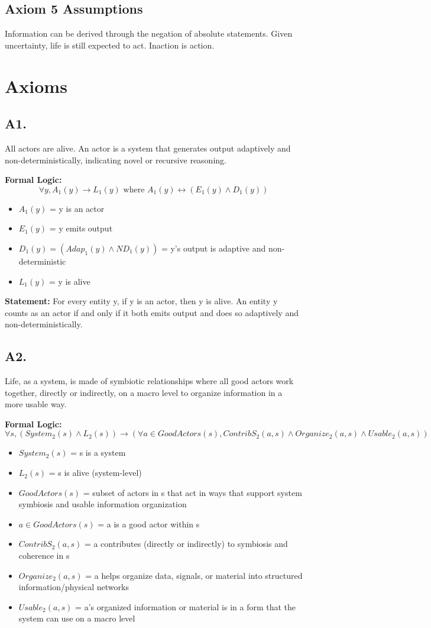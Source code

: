 \documentclass[11pt]{article}
\begin{document}
\subsection*{Axiom 5 Assumptions}
Information can be derived through the negation of absolute statements. 
Given uncertainty, life is still expected to act.
Inaction is action.

\section*{Axioms}

\subsection*{A1.}
All actors are alive. An actor is a system that generates output adaptively and non-deterministically, indicating novel or recursive reasoning. 

\textbf{Formal Logic:}
\[
\forall y, A_1(y) \rightarrow L_1(y) \text{ where } A_1(y) \leftrightarrow (E_1(y) \land D_1(y))
\]
\begin{itemize}
\item $A_1(y)$ = y is an actor
\item $E_1(y)$ = y emits output
\item $D_1(y) = (Adap_1(y) \land ND_1(y))$ = y’s output is adaptive and non-deterministic
\item $L_1(y)$ = y is alive
\end{itemize}
\textbf{Statement:}  
For every entity y, if y is an actor, then y is alive. An entity y counts as an actor if and only if it both emits output and does so adaptively and non-deterministically. 

\subsection*{A2.}
Life, as a system, is made of symbiotic relationships where all good actors work together, directly or indirectly, on a macro level to organize information in a more usable way.

\textbf{Formal Logic:}
\[
\forall s, (System_2(s) \land L_2(s)) \rightarrow (\forall a \in GoodActors(s), ContribS_2(a,s) \land Organize_2(a,s) \land Usable_2(a,s))
\]
\begin{itemize}
\item $System_2(s)$ = s is a system
\item $L_2(s)$ = s is alive (system-level)
\item $GoodActors(s)$ = subset of actors in s that act in ways that support system symbiosis and usable information organization
\item $a \in GoodActors(s)$ = a is a good actor within s
\item $ContribS_2(a,s)$ = a contributes (directly or indirectly) to symbiosis and coherence in s
\item $Organize_2(a,s)$ = a helps organize data, signals, or material into structured information/physical networks
\item $Usable_2(a,s)$ = a’s organized information or material is in a form that the system can use on a macro level
\end{itemize}
\end{document}
